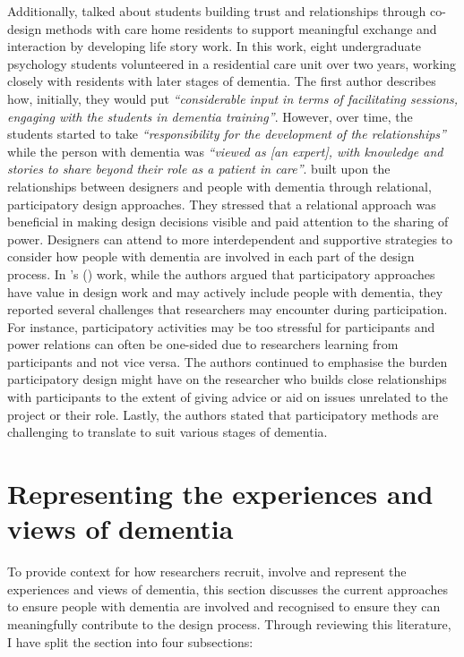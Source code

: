 Additionally, \cite{foley_student_2020} talked about students building trust and relationships through co-design methods with care home residents to support meaningful exchange and interaction by developing life story work. In this work, eight undergraduate psychology students volunteered in a residential care unit over two years, working closely with residents with later stages of dementia. The first author describes how, initially, they would put \textit{``considerable input in terms of facilitating sessions, engaging with the students in dementia training''}. However, over time, the students started to take \textit{``responsibility for the development of the relationships''} while the person with dementia was \textit{``viewed as [an expert], with knowledge and stories to share beyond their role as a patient in care''\citep[p.9]{foley_student_2020}}. \cite{hendriks_valuing_2018} built upon the relationships between designers and people with dementia through relational, participatory design approaches. They stressed that a relational approach was beneficial in making design decisions visible and paid attention to the sharing of power. Designers can attend to more interdependent and supportive strategies to consider how people with dementia are involved in each part of the design process. In \citeauthor{hendriks_challenges_2014}'s (\citeyear{hendriks_challenges_2014}) work, while the authors argued that participatory approaches have value in design work and may actively include people with dementia, they reported several challenges that researchers may encounter during participation. For instance, participatory activities may be too stressful for participants and power relations can often be one-sided due to researchers learning from participants and not vice versa. The authors continued to emphasise the burden participatory design might have on the researcher who builds close relationships with participants to the extent of giving advice or aid on issues unrelated to the project or their role. Lastly, the authors stated that participatory methods are challenging to translate to suit various stages of dementia.

\section{Representing the experiences and views of dementia}
\label{BL:Outside-HCI}
To provide context for how researchers recruit, involve and represent the experiences and views of dementia, this section discusses the current approaches to ensure people with dementia are involved and recognised to ensure they can meaningfully contribute to the design process. Through reviewing this literature, I have split the section into four subsections:

